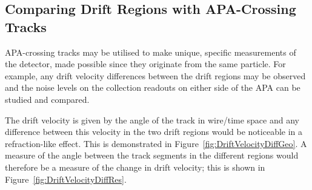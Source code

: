 \subsection{Comparing Drift Regions with APA-Crossing Tracks}\label{sec:APACrossingDriftComparison}

APA-crossing tracks may be utilised to make unique, specific measurements of the detector, made possible since they originate from the same particle.  For example, any drift velocity differences between the drift regions may be observed and the noise levels on the collection readouts on either side of the APA can be studied and compared.

The drift velocity is given by the angle of the track in wire/time space and any difference between this velocity in the two drift regions would be noticeable in a refraction-like effect.  This is demonstrated in Figure~\ref{fig:DriftVelocityDiffGeo}.  A measure of the angle between the track segments in the different regions would therefore be a measure of the change in drift velocity; this is shown in Figure~\ref{fig:DriftVelocityDiffRes}.

